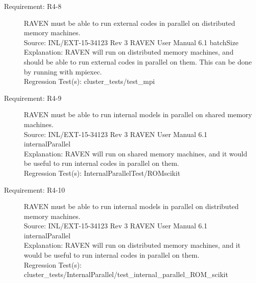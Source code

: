 \documentclass{article}
\newcommand{\requirement}[5]{\item[Requirement: #1] #2 \\Source: #3\\Explanation: #4\\Regression Test(s): #5}
\begin{document}
\begin{description}
\requirement{R4-8}{RAVEN must be able to run external codes in parallel on distributed memory machines.}
{INL/EXT-15-34123 Rev 3 RAVEN User Manual 6.1 batchSize}
{RAVEN will run on distributed memory machines, and should be able to run external codes in parallel on them.  This can be done by running with mpiexec.}
{cluster\_tests/test\_mpi}

\requirement{R4-9}{RAVEN must be able to run internal models in parallel on shared memory machines.}
{INL/EXT-15-34123 Rev 3 RAVEN User Manual 6.1 internalParallel}
{RAVEN will run on shared memory machines, and it would be useful to run internal codes in parallel on them.}
{InternalParallelTest/ROMscikit}

\requirement{R4-10}{RAVEN must be able to run internal models in parallel on distributed memory machines.}
{INL/EXT-15-34123 Rev 3 RAVEN User Manual 6.1 internalParallel}
{RAVEN will run on distributed memory machines, and it would be useful to run internal codes in parallel on them.}
{cluster\_tests/InternalParallel/test\_internal\_parallel\_ROM\_scikit}

\end{description}
\end{document}
